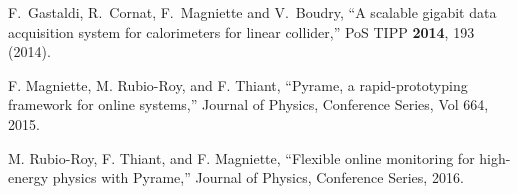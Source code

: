 \documentclass[a4paper,11pt]{article}
\begin{document}
\begin{thebibliography}{99}
  F.~Gastaldi, R.~Cornat, F.~Magniette and V.~Boudry,
 ``A scalable gigabit data acquisition system for calorimeters for linear collider,''
  PoS TIPP {\bf 2014}, 193 (2014).

  F. Magniette, M. Rubio-Roy, and F. Thiant,
  ``Pyrame, a rapid-prototyping framework for online systems,''
  Journal of Physics, Conference Series, Vol 664, 2015.

  M. Rubio-Roy, F. Thiant, and F. Magniette,
  ``Flexible online monitoring for high-energy physics with Pyrame,''
  Journal of Physics, Conference Series, 2016. 

  




\end{thebibliography}
\end{document}

